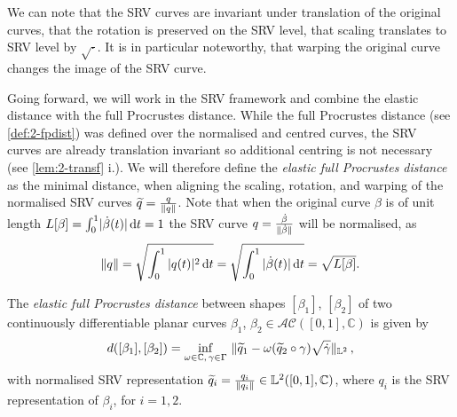 \noindent We can note that the SRV curves are invariant under translation of the original curves, that the rotation is preserved on the SRV level, that scaling translates to SRV level by $\sqrt{\cdot}$.
It is in particular noteworthy, that warping the original curve changes the image of the SRV curve.

Going forward, we will work in the SRV framework and combine the elastic distance with the full Procrustes distance.
While the full Procrustes distance (see \cref{def:2-fpdist}) was defined over the normalised and centred curves, the SRV curves are already translation invariant so additional centring is not necessary (see \cref{lem:2-transf} i.).
We will therefore define the \emph{elastic full Procrustes distance} as the minimal distance, when aligning the scaling, rotation, and warping of the normalised SRV curves $\widetilde q = \frac{q}{\lVert q\rVert}$.
Note that when the original curve $\beta$ is of unit length $L[\beta] = \int_0^1 \lvert\dot\beta(t)\rvert \mathop{\mathrm{d}t} = 1$ the SRV curve $q = \frac{\dot\beta}{\lVert\dot\beta\rVert}$ will be normalised, as 
\begin{equation}
  \label{eq:2-norm}
  \lVert q\rVert = \sqrt{ \int_0^1 |q(t)|^2 \mathop{\mathrm{d}t}} = \sqrt{\int_0^1 |\dot{\beta}(t)| \mathop{\mathrm{d}t}} = \sqrt{L[\beta]}.
\end{equation}

\begin{definition}
  \label{def:2-elfpdist}
  The \emph{elastic full Procrustes distance} between shapes $[\beta_1]$, $[\beta_2]$ of two continuously differentiable planar curves $\beta_1$, $\beta_2 \in \mathcal{AC}([0,1],\mathbb{C})$  is given by 
    \begin{equation}
      \label{eq:2-elfpdist-def}
      d([\beta_1], [\beta_2]) = \inf_{\omega \in \mathbb{C},\, \gamma \in \Gamma} \,\, \lVert\widetilde q_1 - \omega (\widetilde q_2 \circ \gamma) \sqrt{\dot\gamma}\rVert_{\mathbb{L}^2}\,,
    \end{equation}
    with normalised SRV representation $\widetilde q_{i} = \frac{q_{i}}{\lVert q_{i}\rVert} \in \mathbb{L}^2([0,1], \mathbb{C})$, where $q_i$ is the SRV representation of $\beta_i$, for $i = 1,2$.
\end{definition}

